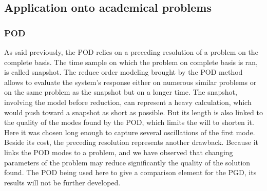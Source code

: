 \documentclass[12pt,a4paper]{article}
\begin{document}
\subsection{Application onto academical problems}

\subsubsection{POD}
As said previously, the POD relies on a preceding resolution of a problem on the complete basis. The time sample on which the problem on complete basis is ran, is called snapshot. The reduce order modeling brought by the POD method allows to evaluate the system's response either on numerous similar problems or on the same problem as the snapshot but on a longer time. The snapshot, involving the model before reduction, can represent a heavy calculation, which would push toward a snapshot as short as possible. But its length is also linked to the quality of the modes found by the POD, which limits the will to shorten it. Here it was chosen long enough to capture several oscillations of the first mode. Beside its cost, the preceding resolution represents another drawback. Because it links the POD modes to a problem, and we have observed that changing parameters of the problem may reduce significantly the quality of the solution found. The POD being used here to give a comparison element for the PGD, its results will not be further developed.
\end{document}
